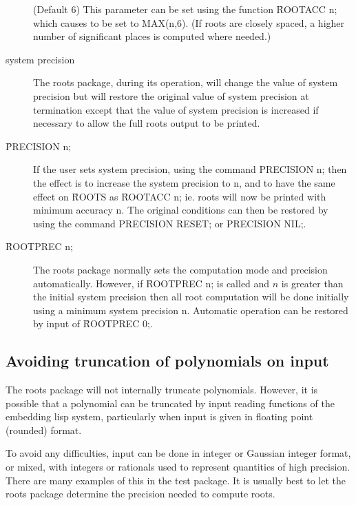 \begin{description}
\hypertarget{reserved:ROOTACC}{}
\hypertarget{operator:ROOTACC}{}
\item[\var{ROOTACC!\#}] (Default 6) This parameter can be set using the function
\f{ROOTACC} n; which causes  to be set to MAX(n,6).
(If roots are closely spaced, a higher number of
significant places is computed where needed.)

\item[system precision] The roots package, during its operation, will
change the value of system precision but will restore the original value
of system precision at termination except that the value of system
precision is increased if necessary to allow the full roots output to be
printed.

\item[\f{PRECISION} n;] If the user sets system precision, using the command
PRECISION n; then the effect is to increase the system precision to n, and
to have the same effect on \f{ROOTS} as \f{ROOTACC} n; ie. roots will now be
printed with minimum accuracy n.  The original conditions can then be
restored by using the command PRECISION RESET; or PRECISION NIL;.

\hypertarget{operator:ROOTPREC}{}
\item[\f{ROOTPREC} n;] The roots package normally sets the computation mode and
precision automatically.  However, if \f{ROOTPREC} n; is
called and $n$ is greater than the initial system precision then all root
computation will be done initially using a minimum system precision n.
Automatic operation can be restored by input of \f{ROOTPREC} 0;.
\end{description}


\subsection{Avoiding truncation of polynomials on input}

The roots package will not internally truncate polynomials.  However, it
is possible that a polynomial can be truncated by input reading functions
of the embedding lisp system, particularly when input is given in floating
point (rounded) format.

To avoid any difficulties, input can be done in integer or Gaussian
integer format, or mixed, with integers or rationals used to represent
quantities of high precision. There are many examples of this in the
test package.  It is usually best to let the roots package
determine the precision needed to compute roots.


